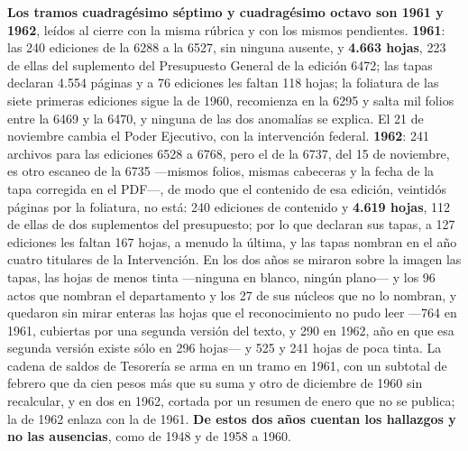 \textbf{Los tramos cuadragésimo séptimo y cuadragésimo octavo son 1961 y 1962}, leídos al cierre con la misma rúbrica y con los mismos pendientes. \textbf{1961}: las 240 ediciones de la 6288 a la 6527, sin ninguna ausente, y \textbf{4.663 hojas}, 223 de ellas del suplemento del Presupuesto General de la edición 6472; las tapas declaran 4.554 páginas y a 76 ediciones les faltan 118 hojas; la foliatura de las siete primeras ediciones sigue la de 1960, recomienza en la 6295 y salta mil folios entre la 6469 y la 6470, y ninguna de las dos anomalías se explica. El 21 de noviembre cambia el Poder Ejecutivo, con la intervención federal. \textbf{1962}: 241 archivos para las ediciones 6528 a 6768, pero el de la 6737, del 15 de noviembre, es otro escaneo de la 6735 ---mismos folios, mismas cabeceras y la fecha de la tapa corregida en el PDF---, de modo que el contenido de esa edición, veintidós páginas por la foliatura, no está: 240 ediciones de contenido y \textbf{4.619 hojas}, 112 de ellas de dos suplementos del presupuesto; por lo que declaran sus tapas, a 127 ediciones les faltan 167 hojas, a menudo la última, y las tapas nombran en el año cuatro titulares de la Intervención. En los dos años se miraron sobre la imagen las tapas, las hojas de menos tinta ---ninguna en blanco, ningún plano--- y los 96 actos que nombran el departamento y los 27 de sus núcleos que no lo nombran, y quedaron sin mirar enteras las hojas que el reconocimiento no pudo leer ---764 en 1961, cubiertas por una segunda versión del texto, y 290 en 1962, año en que esa segunda versión existe sólo en 296 hojas--- y 525 y 241 hojas de poca tinta. La cadena de saldos de Tesorería se arma en un tramo en 1961, con un subtotal de febrero que da cien pesos más que su suma y otro de diciembre de 1960 sin recalcular, y en dos en 1962, cortada por un resumen de enero que no se publica; la de 1962 enlaza con la de 1961. \textbf{De estos dos años cuentan los hallazgos y no las ausencias}, como de 1948 y de 1958 a 1960.


